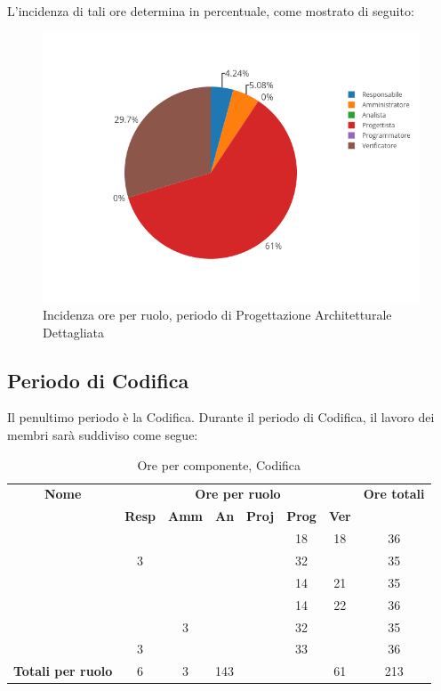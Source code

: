 L'incidenza di tali ore determina in percentuale, come mostrato di seguito:
\begin{figure}[H]
	\centering
	\includegraphics[scale=0.6]{img/ProgettazioneDettaglio.png}
	\caption{Incidenza ore per ruolo, periodo di Progettazione Architetturale Dettagliata}
\end{figure}

\newpage
\subsection{Periodo di Codifica}
Il penultimo periodo è la Codifica. Durante il periodo di Codifica, il lavoro dei membri sarà suddiviso come segue:

\begin{table}[H]
	\begin{center}
		\begin{tabular}{|c|c|c|c|c|c|c|c|}
			\hline
			\textbf{Nome} & \multicolumn{6}{c|}{\textbf{Ore per ruolo}} & \textbf{Ore totali} \\\cline{2-7}
			& \textbf{Resp} & \textbf{Amm} & \textbf{An} & \textbf{Proj} & \textbf{Prog} & \textbf{Ver} & \\
			\hline
			\MC			&		&		&		&		&	18	&	18	&	36	\\
			\hline
			\AN			&	3	&		&		&	 	&	32	&		& 	35	\\
			\hline
			\DAN		&		&		&		&		&	14	&	21	&	35	\\
			\hline
			\AS			&		&	 	&	 	&		&	14 	& 	22	&	36	\\
			\hline
			\NS 		&		&	3	&		&		&	32	& 		&	35	\\
			\hline
			\DS			& 	3	&		&		&		&	33	&		&	36	\\
			\hline
			\textbf{Totali per ruolo}	& 	6	&	3	&	143	& 	&		&	61	&	213	\\
			\hline
		\end{tabular}
	\end{center}
	\caption{Ore per componente, Codifica}
\end{table}

